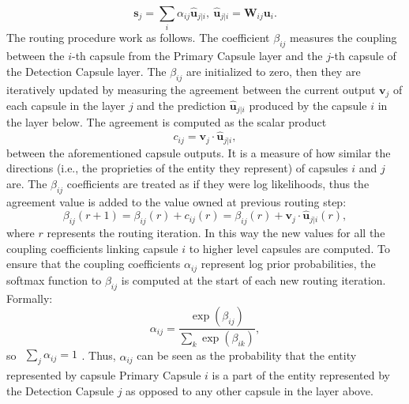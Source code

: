 \begin{equation}
\label{eq:capsule2}
\mathbf{s}_j = \sum_{i}{} \alpha_{ij}\hat{\mathbf{u}}_{j|i},  ~ \hat{\mathbf{u}}_{j|i} = \mathbf{W}_{ij}\mathbf{u}_i.
\end{equation}
The routing procedure work as follows. The coefficient $\beta_{ij}$ measures the coupling between the $i$-th capsule from the Primary Capsule layer and the $j$-th capsule of the Detection Capsule layer. The $\beta_{ij}$ are initialized to zero, then they are iteratively updated by measuring the agreement between the current output $\mathbf{v}_j$ of each capsule in the layer $j$ and the prediction $\hat{\mathbf{u}}_{j|i}$ produced by the capsule $i$ in the layer below. 
The agreement is computed as the scalar product 
\begin{equation}
c_{ij} = \mathbf{v}_j \cdot \hat{\mathbf{u}}_{j|i},
\end{equation}
between the aforementioned capsule outputs. It is a measure of how similar the directions (i.e., the proprieties of the entity they represent) of capsules $i$ and $j$ are. 
The $\beta_{ij}$ coefficients are treated as if they were log likelihoods, thus the agreement value is added to the value owned at previous routing step:
\begin{equation}
\label{eq:routing_update}
\beta_{ij} (r + 1) =  \beta_{ij} (r) + c_{ij} (r)  =   \beta_{ij} (r) + \mathbf{v}_j \cdot \hat{\mathbf{u}}_{j|i} (r), 
\end{equation}
where $r$ represents the routing iteration. In this way the new values for all the coupling
coefficients linking capsule $i$ to higher level capsules are computed.
To ensure that the coupling coefficients $\alpha_{ij}$ represent log prior probabilities, the softmax function to $\beta_{ij}$ is computed at the start of each new routing iteration. Formally:
\begin{equation}
\alpha_{ij} = \frac{\exp(\beta_{ij})}{\sum_{k}\exp(\beta_{ik})},
\end{equation}
so $ \begin{matrix}\sum_{j}^{} \alpha_{ij} = 1 \end{matrix}$.
Thus, $\alpha_{ij}$ can be seen as the probability that the entity represented by capsule Primary Capsule $i$ is a part of the entity represented by the Detection Capsule $j$ as opposed to any other capsule in the layer above.


